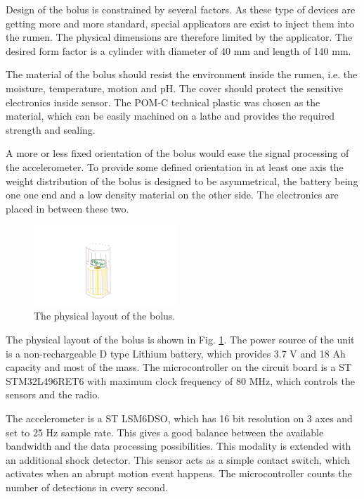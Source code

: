\documentclass[conference]{IEEEtran}
\begin{document}
Design of the bolus is constrained by several factors. As these type
of devices are getting more and more standard, special applicators are
exist to inject them into the rumen. The physical dimensions are therefore
limited by the applicator. The desired form factor is a cylinder with
diameter of 40 mm and length of 140 mm.

The material of the bolus should resist the environment inside the rumen,
i.e. the moisture, temperature, motion and pH. The cover should protect
the sensitive electronics inside sensor. The POM-C technical plastic was
chosen as the material, which can be easily machined on a lathe and provides
the required strength and sealing.

A more or less fixed orientation of the bolus would ease the signal
processing of the accelerometer. To provide some defined orientation
in at least one axis the weight distribution of the bolus is designed
to be asymmetrical, the battery being one one end and a low density
material on the other side. The electronics are placed in between these two.

\begin{figure}[htbp]
  \centerline{\includegraphics[width=0.48\textwidth]{fig/bolus-physical-layout.png}}
  \caption{The physical layout of the bolus.}
  \label{bolus-physical-layout}
\end{figure}

The physical layout of the bolus is shown in Fig. \ref{bolus-physical-layout}.
The power source of the unit is a non-rechargeable D type Lithium battery,
which provides 3.7 V and 18 Ah capacity and most of the mass. The
microcontroller on the circuit board is a ST STM32L496RET6 with maximum
clock frequency of 80 MHz, which controls the
sensors and the radio.

The accelerometer is a ST LSM6DSO, which has 16 bit resolution on 3 axes and
set to 25 Hz sample rate. This gives a good balance between the available
bandwidth and the data processing possibilities. This modality is extended
with an additional shock detector. This sensor acts as a simple contact switch,
which activates when an abrupt motion event happens. The microcontroller
counts the number of detections in every second.
\end{document}
